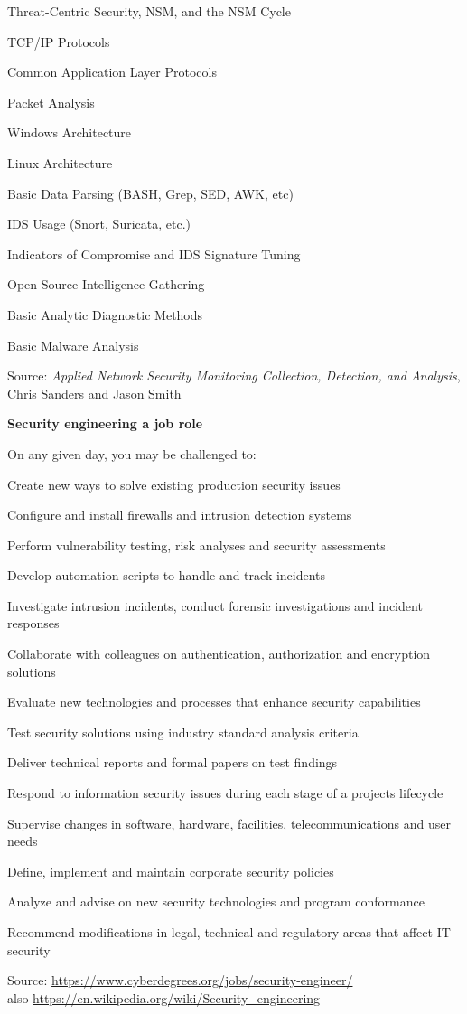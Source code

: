 \documentclass[a4paper,11pt,notitlepage,landscape]{report}
\begin{document}
\begin{list2}\small
\item Threat-Centric Security, NSM, and the NSM Cycle
\item TCP/IP Protocols
\item Common Application Layer Protocols
\item Packet Analysis
\item Windows Architecture
\item Linux Architecture
\item Basic Data Parsing (BASH, Grep, SED, AWK, etc)
\item IDS Usage (Snort, Suricata, etc.)
\item Indicators of Compromise and IDS Signature Tuning
\item Open Source Intelligence Gathering
\item Basic Analytic Diagnostic Methods
\item Basic Malware Analysis
\end{list2}

Source: \emph{Applied Network Security Monitoring Collection, Detection, and Analysis}, Chris Sanders and Jason Smith

\eject
{\bf Security engineering a job role}

On any given day, you may be challenged to:
\begin{list2}\small
\item Create new ways to solve existing production security issues
\item Configure and install firewalls and intrusion detection systems
\item Perform vulnerability testing, risk analyses and security assessments
\item Develop automation scripts to handle and track incidents
\item Investigate intrusion incidents, conduct forensic investigations and incident responses
\item Collaborate with colleagues on authentication, authorization and encryption solutions
\item Evaluate new technologies and processes that enhance security capabilities
\item Test security solutions using industry standard analysis criteria
\item Deliver technical reports and formal papers on test findings
\item Respond to information security issues during each stage of a projects lifecycle
\item Supervise changes in software, hardware, facilities, telecommunications and user needs
\item Define, implement and maintain corporate security policies
\item Analyze and advise on new security technologies and program conformance
\item Recommend modifications in legal, technical and regulatory areas that affect IT security
\end{list2}

Source: \url{https://www.cyberdegrees.org/jobs/security-engineer/}\\
also
\url{https://en.wikipedia.org/wiki/Security_engineering}
\end{document}
